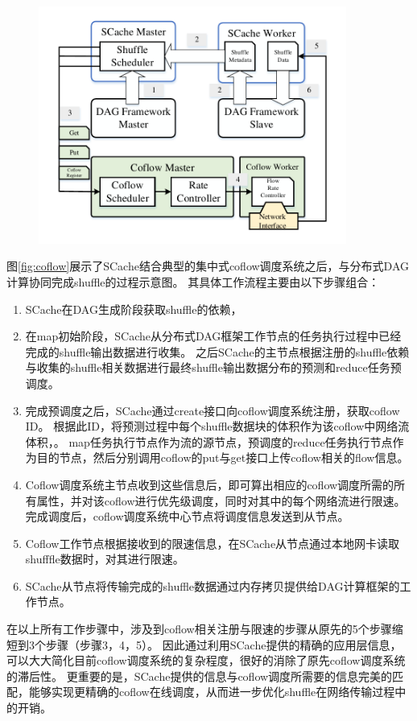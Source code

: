 \begin{figure}[!htp]
    \centering
    \includegraphics[width=0.9\textwidth]{../figure/coflow.pdf}
\end{figure}

图\ref{fig:coflow}展示了SCache结合典型的集中式coflow调度系统之后，与分布式DAG计算协同完成shuffle的过程示意图。
其具体工作流程主要由以下步骤组合：

\begin{enumerate}
	\item SCache在DAG生成阶段获取shuffle的依赖，
	\item 在map初始阶段，SCache从分布式DAG框架工作节点的任务执行过程中已经完成的shuffle输出数据进行收集。
	之后SCache的主节点根据注册的shuffle依赖与收集的shuffle相关数据进行最终shuffle输出数据分布的预测和reduce任务预调度。
	\item 完成预调度之后，SCache通过create接口向coflow调度系统注册，获取coflow ID。
	根据此ID，将预测过程中每个shuffle数据块的体积作为该coflow中网络流体积，。
	map任务执行节点作为流的源节点，预调度的reduce任务执行节点作为目的节点，然后分别调用coflow的put与get接口上传coflow相关的flow信息。
	\item Coflow调度系统主节点收到这些信息后，即可算出相应的coflow调度所需的所有属性，并对该coflow进行优先级调度，同时对其中的每个网络流进行限速。完成调度后，coflow调度系统中心节点将调度信息发送到从节点。
	\item Coflow工作节点根据接收到的限速信息，在SCache从节点通过本地网卡读取shufffle数据时，对其进行限速。
	\item SCache从节点将传输完成的shuffle数据通过内存拷贝提供给DAG计算框架的工作节点。
\end{enumerate}

在以上所有工作步骤中，涉及到coflow相关注册与限速的步骤从原先的5个步骤缩短到3个步骤（步骤3，4，5）。
因此通过利用SCache提供的精确的应用层信息，可以大大简化目前coflow调度系统的复杂程度，很好的消除了原先coflow调度系统的滞后性。
更重要的是，SCache提供的信息与coflow调度所需要的信息完美的匹配，能够实现更精确的coflow在线调度，从而进一步优化shuffle在网络传输过程中的开销。

